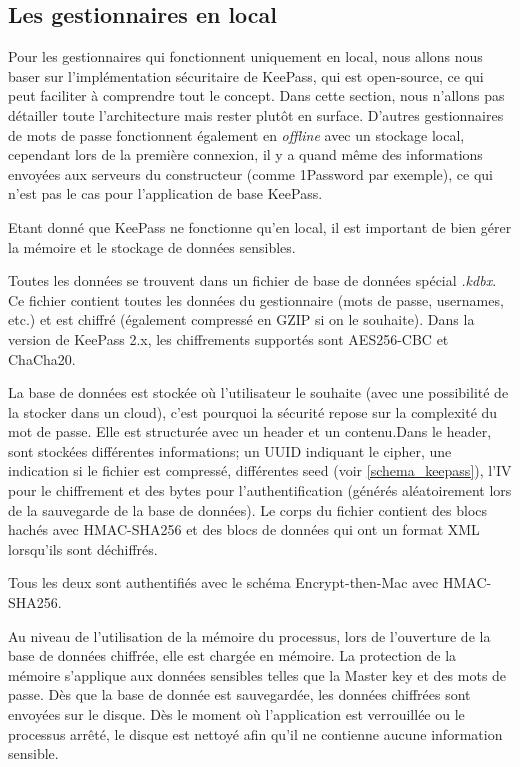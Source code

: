 \subsection{Les gestionnaires en local}
Pour les gestionnaires qui fonctionnent uniquement en local, nous allons nous baser sur l'implémentation sécuritaire de KeePass, qui est open-source, ce qui peut faciliter à comprendre tout le concept. Dans cette section, nous n'allons pas détailler toute l'architecture mais rester plutôt en surface. D'autres gestionnaires de mots de passe fonctionnent également en \textit{offline} avec un stockage local, cependant lors de la première connexion, il y a quand même des informations envoyées aux serveurs du constructeur (comme 1Password par exemple), ce qui n'est pas le cas pour l'application de base KeePass.

Etant donné que KeePass ne fonctionne qu'en local, il est important de bien gérer la mémoire et le stockage de données sensibles.

Toutes les données se trouvent dans un fichier de base de données spécial \textit{.kdbx}. Ce fichier contient toutes les données du gestionnaire (mots de passe, usernames, etc.) et est chiffré (également compressé en GZIP si on le souhaite). Dans la version de KeePass 2.x, les chiffrements supportés sont AES256-CBC et ChaCha20. 

La base de données est stockée où l'utilisateur le souhaite (avec une possibilité de la stocker dans un cloud), c'est pourquoi la sécurité repose sur la complexité du mot de passe. Elle est structurée avec un header et un contenu\cite{keepassstruct}\cite{keepassieee}.Dans le header, sont stockées différentes informations; un UUID indiquant le cipher, une indication si le fichier est compressé, différentes seed (voir \ref{schema_keepass}), l'IV pour le chiffrement et des bytes pour l'authentification (générés aléatoirement lors de la sauvegarde de la base de données). Le corps du fichier contient des blocs hachés avec HMAC-SHA256 et des blocs de données qui ont un format XML lorsqu'ils sont déchiffrés.

Tous les deux sont authentifiés avec le schéma Encrypt-then-Mac avec HMAC-SHA256. 

Au niveau de l'utilisation de la mémoire du processus, lors de l'ouverture de la base de données chiffrée, elle est chargée en mémoire. La protection de la mémoire s'applique aux données sensibles telles que la Master key et des mots de passe. Dès que la base de donnée est sauvegardée, les données chiffrées sont envoyées sur le disque. Dès le moment où l'application est verrouillée ou le processus arrêté, le disque est nettoyé afin qu'il ne contienne aucune information sensible.

